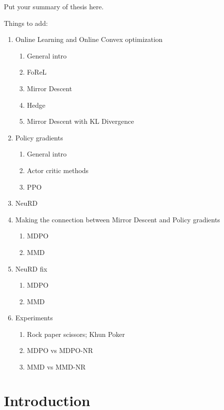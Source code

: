 \documentclass{uicthesi}
\begin{document}
\summary
Put your summary of thesis here.

Things to add:

\begin{enumerate}
  \item Online Learning and Online Convex optimization
    \begin{enumerate}
      \item General intro
      \item FoReL
      \item Mirror Descent
      \item Hedge
      \item Mirror Descent with KL Divergence
    \end{enumerate}
  \item Policy gradients
  \begin{enumerate}
    \item General intro
    \item Actor critic methods
    \item PPO
  \end{enumerate}
  \item NeuRD
  \item Making the connection between Mirror Descent and Policy gradients
  \begin{enumerate}
    \item MDPO
    \item MMD
  \end{enumerate}
  \item NeuRD fix
  \begin{enumerate}
    \item MDPO
    \item MMD
  \end{enumerate}  
  \item Experiments
  \begin{enumerate}
    \item Rock paper scissors; Khun Poker
    \item MDPO vs MDPO-NR
    \item MMD vs MMD-NR
  \end{enumerate}
\end{enumerate}






\chapter{Introduction}
\end{document}
